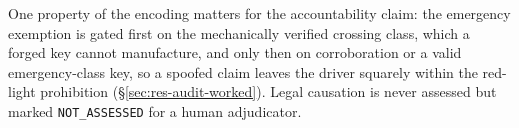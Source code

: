 One property of the encoding matters for the accountability claim: the
emergency exemption is gated first on the mechanically verified crossing
class, which a forged key cannot manufacture, and only then on
corroboration or a valid emergency-class key, so a spoofed claim leaves
the driver squarely within the red-light prohibition
(\S\ref{sec:res-audit-worked}). Legal causation is never assessed but
marked \texttt{NOT\_ASSESSED} for a human adjudicator.
